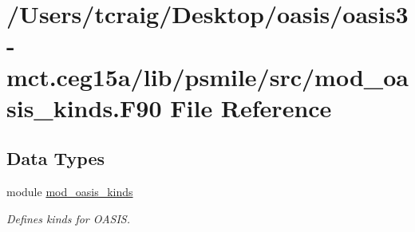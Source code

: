 \hypertarget{mod__oasis__kinds_8_f90}{\section{/\+Users/tcraig/\+Desktop/oasis/oasis3-\/mct.ceg15a/lib/psmile/src/mod\+\_\+oasis\+\_\+kinds.F90 File Reference}
\label{mod__oasis__kinds_8_f90}
}
\subsection*{Data Types}
\begin{DoxyCompactItemize}
\item 
module \hyperlink{classmod__oasis__kinds}{mod\+\_\+oasis\+\_\+kinds}
\begin{DoxyCompactList}\small\item\em Defines kinds for O\+A\+S\+I\+S. \end{DoxyCompactList}\end{DoxyCompactItemize}
